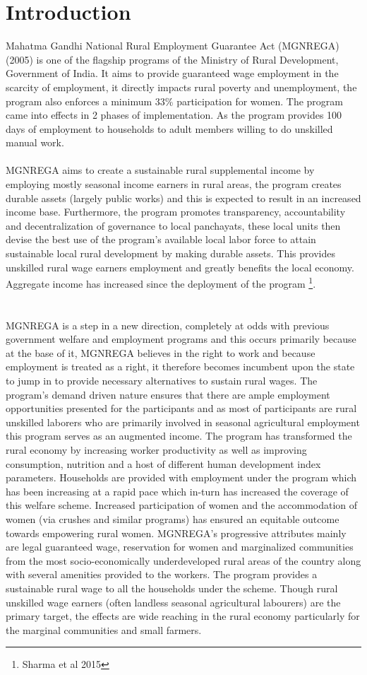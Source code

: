 \documentclass{article}
\begin{document}
\section{Introduction}
\label{intro}
Mahatma Gandhi National Rural Employment Guarantee Act (MGNREGA) (2005) is one of the flagship programs of the Ministry of Rural Development, Government of India. It aims to provide guaranteed wage employment in the scarcity of employment, it directly impacts rural poverty and unemployment, the program also enforces a minimum 33\% participation for women. The program came into effects in 2 phases of implementation. As the program provides 100 days of employment to households to adult members willing to do unskilled manual work. 
\\\\
MGNREGA aims to create a sustainable rural supplemental income by employing mostly seasonal income earners in rural areas, the program creates durable assets (largely public works) and this is expected to result in an increased income base. Furthermore, the program promotes transparency, accountability and decentralization of governance to local panchayats, these local units then devise the best use of the program’s available local labor force to attain sustainable local rural development by making durable assets. This provides unskilled rural wage earners employment and greatly benefits the local economy. Aggregate income has increased since the deployment of the program \footnote{ Sharma et al 2015}. 
\\
\\
\\
MGNREGA is a step in a new direction, completely at odds with previous government welfare and employment programs and this occurs primarily because at the base of it, MGNREGA believes in the right to work and because employment is treated as a right, it therefore becomes incumbent upon the state to jump in to provide necessary alternatives to sustain rural wages. The program’s demand driven nature ensures that there are ample employment opportunities presented for the participants and as most of participants are rural unskilled laborers who are primarily involved in seasonal agricultural employment this program serves as an augmented income. The program has transformed the rural economy by increasing worker productivity as well as improving consumption, nutrition and a host of different human development index parameters. Households are provided with employment under the program which has been increasing at a rapid pace which in-turn has increased the coverage of this welfare scheme. Increased participation of women and the accommodation of women (via crushes and similar programs) has ensured an equitable outcome towards empowering rural women. MGNREGA’s progressive attributes mainly are legal guaranteed wage, reservation for women and marginalized communities from the most socio-economically underdeveloped rural areas of the country along with several amenities provided to the workers. The program provides a sustainable rural wage to all the households under the scheme. Though rural unskilled wage earners (often landless seasonal agricultural labourers) are the primary target, the effects are wide reaching in the rural economy particularly for the marginal communities and small farmers.
\end{document}
